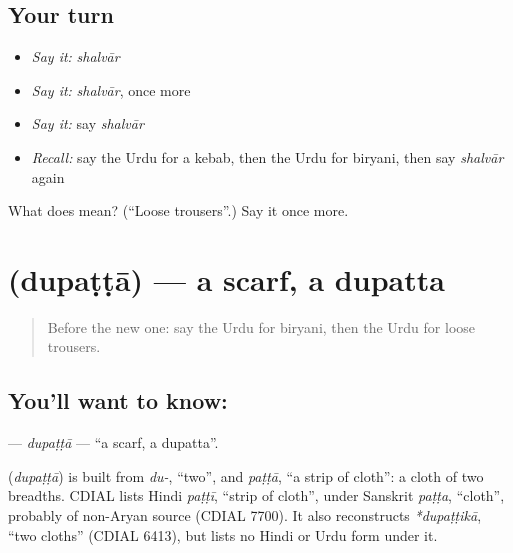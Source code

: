 \subsection*{Your turn}
\begin{itemize}
\raggedright
  \item \emph{Say it:} \emph{shalvār}
  \item \emph{Say it:} \emph{shalvār}, once more
  \item \emph{Say it:} say \emph{shalvār}
  \item \emph{Recall:} say the Urdu for a kebab, then the Urdu for biryani, then say \emph{shalvār} again
\end{itemize}

\begin{tcolorbox}[breakable,colback=teal!4,colframe=teal!35!black,title={Before you move on}]
What does  mean? (\textquotedblleft{}Loose trousers\textquotedblright{}.) Say it once more.
\end{tcolorbox}
\section[\texorpdfstring{\ur{دوپٹہ} (dupaṭṭā)}{دوپٹہ (dupaṭṭā)}]{ (dupaṭṭā) — a scarf, a dupatta}

\label{lesson:UR-C121-dupatta}



\begin{quote}
Before the new one: say the Urdu for biryani, then the Urdu for loose trousers.
\end{quote}

\subsection*{You'll want to know: }
\textbf{} — \emph{dupaṭṭā} — \textquotedblleft{}a scarf, a dupatta\textquotedblright{}.

\begin{cousinweb}
\textbf{} (\emph{dupaṭṭā}) is built from \emph{du-}, \textquotedblleft{}two\textquotedblright{}, and \emph{paṭṭā}, \textquotedblleft{}a strip of cloth\textquotedblright{}: a cloth of two breadths. CDIAL lists Hindi \emph{paṭṭī}, \textquotedblleft{}strip of cloth\textquotedblright{}, under Sanskrit \emph{paṭṭa}, \textquotedblleft{}cloth\textquotedblright{}, probably of non-Aryan source (CDIAL 7700). It also reconstructs \emph{*dupaṭṭikā}, \textquotedblleft{}two cloths\textquotedblright{} (CDIAL 6413), but lists no Hindi or Urdu form under it.
\end{cousinweb}

